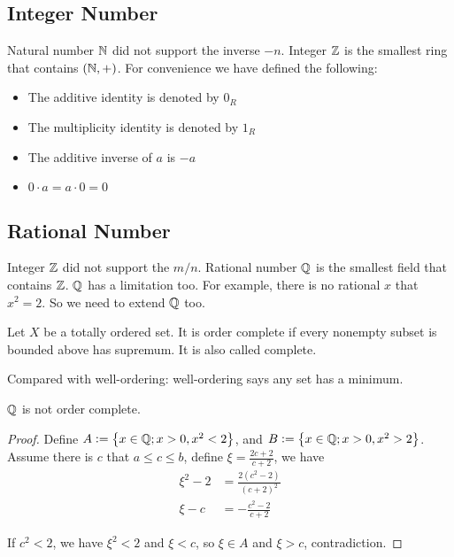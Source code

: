 \subsection{Integer Number}
Natural number $\mathbb{N}$ did not support the inverse $-n$. Integer $\mathbb{Z}$ is the smallest ring that contains $(\mathbb{N}, +)$. For convenience we have defined the following:
\begin{itemize}
    \item The additive identity is denoted by $0_R$
    \item The multiplicity identity is denoted by $1_R$
    \item The additive inverse of $a$ is $-a$
    \item $0 \cdot a = a \cdot 0 = 0$
\end{itemize}

\subsection{Rational Number}
Integer $\mathbb{Z}$ did not support the $m/n$. Rational number $\mathbb{Q}$ is the smallest field that contains $\mathbb{Z}$. $\mathbb{Q}$ has a limitation too. For example, there is no rational $x$ that $x^2 = 2$. So we need to extend $\mathbb{Q}$ too.

\begin{definition}
    Let $X$ be a totally ordered set. It is order complete if every nonempty subset is bounded above has supremum. It is also called complete.
    
    Compared with well-ordering: well-ordering says any set has a minimum.
\end{definition}


\begin{theorem}
    $\mathbb{Q}$ is not order complete.
\end{theorem}
\begin{proof}
    Define $A:=\set{x \in \mathbb{Q}; x > 0 , x^2 < 2}$, and $B:=\set{x \in \mathbb{Q}; x > 0, x^2 > 2}$. Assume there is $c$ that $a \leq c \leq b$, define $\xi = \frac{2c+2}{c+2}$, we have
    \begin{equation}
        \begin{aligned}
            \xi^2 - 2 &= \frac{2(c^2 -2)}{(c+2)^2} \\
            \xi - c &= - \frac{c^2 -2}{c+2}    
        \end{aligned}      
    \end{equation}
    
    If $c^2 < 2$, we have $\xi^2 < 2$ and $\xi < c$, so $\xi \in A$ and $\xi > c$, contradiction.
\end{proof}



